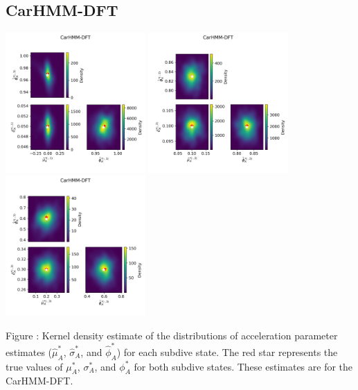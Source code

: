 \documentclass{article}
\begin{document}
        \subsection{CarHMM-DFT}
        \begin{center}
        \includegraphics[width=2.1in]{../Plots/hmm_FV_MLE_density_A_0_0.png}
        \includegraphics[width=2.1in]{../Plots/hmm_FV_MLE_density_A_0_1.png}
        \includegraphics[width=2.1in]{../Plots/hmm_FV_MLE_density_A_0_2.png}
        \end{center}
        
        \noindent Figure : Kernel density estimate of the distributions of acceleration parameter estimates ($\hat \mu^*_A$, $\hat \sigma^*_A$, and $\hat \phi^*_A$) for each subdive state. The red star represents the true values of $\mu^*_A$, $\sigma^*_A$, and $\phi^*_A$ for both subdive states. These estimates are for the CarHMM-DFT.
        \addtocounter{fignum}{1}
        
\end{document}
